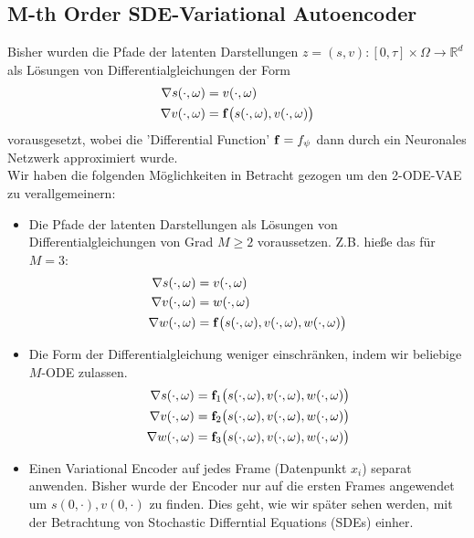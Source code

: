 \documentclass[12pt]{article}
\newcommand{\R}{\mathbb{R}}
\newcommand{\bbf}{\bold{f}}
\begin{document}
	\subsection[SDE-VAE]{M-th Order SDE-Variational Autoencoder}
	Bisher wurden die Pfade der latenten Darstellungen $z = (s,v) : [0,\tau] \times \Omega \rightarrow \R^d$ als Lösungen von Differentialgleichungen der Form
	\begin{align*}
	\nabla s(\cdot,\omega) &= v(\cdot,\omega)\\
	\nabla v(\cdot,\omega) &= \bbf\big(s(\cdot,\omega),v(\cdot,\omega)\big)
	\end{align*}
	vorausgesetzt, wobei die 'Differential Function' $\bbf = f_\psi$ dann durch ein Neuronales Netzwerk approximiert wurde.\\
	Wir haben die folgenden Möglichkeiten in Betracht gezogen um den 2-ODE-VAE zu verallgemeinern:
	\begin{itemize}
		\item Die Pfade der latenten Darstellungen als Lösungen von Differentialgleichungen von Grad $M \geq 2$ voraussetzen. Z.B. hieße das für $M=3$:
		\begin{align*}
		\nabla s(\cdot,\omega) &= v(\cdot,\omega)\\
		\nabla v(\cdot,\omega) &= w(\cdot,\omega)\\
		\nabla w(\cdot,\omega) &= \bbf\big(s(\cdot,\omega),v(\cdot,\omega),w(\cdot,\omega)\big)
		\end{align*}

		\item Die Form der Differentialgleichung weniger einschränken, indem wir beliebige $M$-ODE zulassen.
		\begin{align*}
		\nabla s(\cdot,\omega) &= \bbf_1\big(s(\cdot,\omega),v(\cdot,\omega),w(\cdot,\omega)\big)\\
		\nabla v(\cdot,\omega) &= \bbf_2\big(s(\cdot,\omega),v(\cdot,\omega),w(\cdot,\omega)\big)\\
		\nabla w(\cdot,\omega) &= \bbf_3\big(s(\cdot,\omega),v(\cdot,\omega),w(\cdot,\omega)\big)
		\end{align*}

		\item Einen Variational Encoder auf jedes Frame (Datenpunkt $x_i$) separat anwenden. Bisher wurde der Encoder nur auf die ersten Frames angewendet um $s(0,\cdot), v(0,\cdot)$ zu finden. Dies geht, wie wir später sehen werden, mit der Betrachtung von Stochastic Differntial Equations (SDEs) einher.
	\end{itemize}
\end{document}
